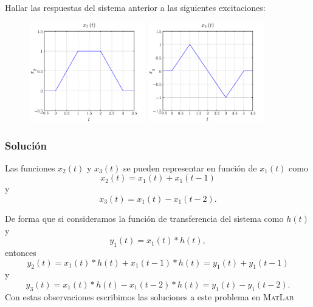 \documentclass[a4paper,12pt,final]{article}
\begin{document}
    \noindent Hallar las respuestas del sistema anterior a las siguientes excitaciones:

    \begin{figure}[H]
      \begin{center}
        \includegraphics[width=0.45\textwidth]{./laboratorio_3/problema02_X2.png}
        \includegraphics[width=0.45\textwidth]{./laboratorio_3/problema02_X3.png}
      \end{center}
    \end{figure}

    \subsubsection*{Solución}
      \noindent Las funciones $x_2\left(t\right)$ y $x_3\left(t\right)$ se pueden representar en función de $x_1\left(t\right)$ como
      $$x_2\left(t\right) = x_1\left(t\right) + x_1\left(t - 1\right)$$
      \noindent y
      $$x_3\left(t\right) = x_1\left(t\right) - x_1\left(t - 2\right).$$

      De forma que si consideramos la función de transferencia del sistema como $h\left(t\right)$ y
      $$y_1\left(t\right) = x_1\left(t\right) * h\left(t\right),$$
      \noindent entonces
      $$y_2\left(t\right) = x_1\left(t\right) * h\left(t\right) + x_1\left(t - 1\right) * h\left(t\right) = y_1\left(t\right) + y_1\left(t - 1\right)$$
      \noindent y
      $$y_3\left(t\right) = x_1\left(t\right) * h\left(t\right) - x_1\left(t - 2\right) * h\left(t\right) = y_1\left(t\right) - y_1\left(t - 2\right).$$
      \noindent Con estas observaciones escribimos las soluciones a este problema en \textsc{MatLab}
\end{document}
